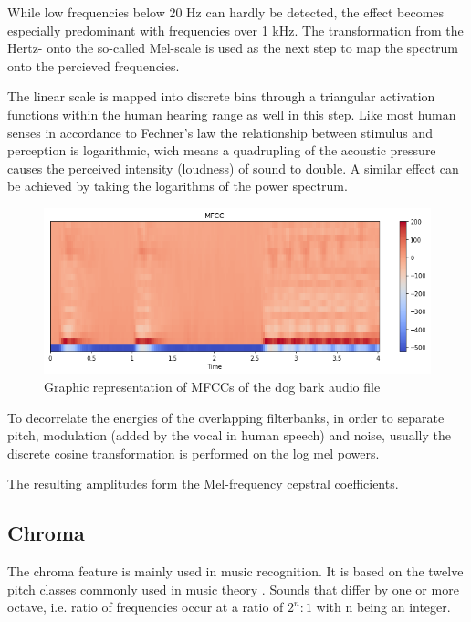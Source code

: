  
 While low frequencies below 20 Hz can hardly be detected, the effect becomes especially predominant with frequencies over 1 kHz. The transformation from the Hertz- onto the so-called Mel-scale is used as the next step to map the spectrum onto the percieved frequencies. 
 
 The linear scale is mapped into discrete bins through a triangular activation functions within the human hearing range as well in this step. Like most human senses in accordance to Fechner’s law \cite{fechner1860} the relationship between stimulus and perception is logarithmic, wich means a quadrupling of the acoustic pressure causes the perceived intensity (loudness) of sound to double. A similar effect can be achieved by taking the logarithms of the power spectrum.
 
  \begin{figure}[h]
    \centering
	\includegraphics[width=.9\textwidth]{./images/illustrations/mfcc}
    \caption{Graphic representation of MFCCs of the dog bark audio file}
    \label{fig:mfcc}
\end{figure}
 
 To decorrelate the energies of the overlapping filterbanks, in order to separate pitch, modulation (added by the vocal in human speech) and noise, usually the discrete cosine transformation is performed on the log mel powers. %
 
 The resulting amplitudes form the Mel-frequency cepstral coefficients.

\subsection{Chroma}

The chroma feature is mainly used in music recognition. It is based on the twelve pitch classes commonly used in music theory \cite{Mller:2015:FMP:2815664}. Sounds that differ by one or more octave, i.e. ratio of frequencies occur at a ratio of $2^n : 1$ with n being an integer.


